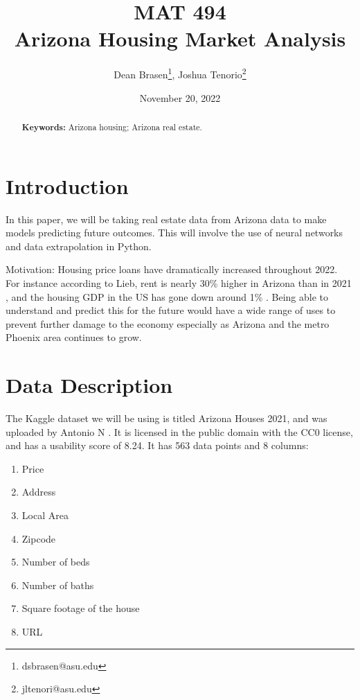 \documentclass[12pt]{article}
\begin{document}
\title{MAT 494\\Arizona Housing Market Analysis}

\author{
Dean Brasen\thanks{dsbrasen@asu.edu}, 
Joshua Tenorio\thanks{jltenori@asu.edu}
}
\date{November 20, 2022}
\maketitle
\begin{abstract}
    {\bf Keywords:} Arizona housing; Arizona real estate.
\end{abstract}
\tableofcontents
\section{Introduction}
In this paper, we will be taking real estate data from Arizona data to make models predicting future outcomes.
This will involve the use of neural networks and data extrapolation in Python.
\vspace{1em}


Motivation: Housing price loans have dramatically increased throughout 2022. For instance according to Lieb, rent is nearly 30\% higher in Arizona than in 2021 \cite{lieb-rent}, and the housing GDP in the US has gone down around 1\% \cite{hammond-GDP}. Being able to understand and predict this for the future would have a wide range of uses to prevent further damage to the economy especially as Arizona and the metro Phoenix area continues to grow.
\section{Data Description}
The Kaggle dataset we will be using is titled Arizona Houses 2021, and was uploaded by Antonio N \cite{kaggle-set}.
It is licensed in the public domain with the CC0 license, and has a usability score of 8.24.
It has 563 data points and 8 columns:
\begin{enumerate}
    \item Price
    \item Address
    \item Local Area
    \item Zipcode
    \item Number of beds
    \item Number of baths
    \item Square footage of the house
    \item URL
\end{enumerate}
\end{document}
